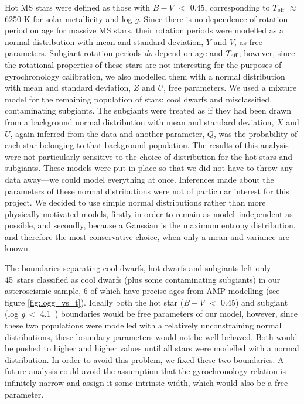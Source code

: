 \documentclass[11pt,preprint]{aastex}
\newcommand{\logg}{log \emph{g}}
\newcommand{\teff}{$T_{\rm{eff}}$}
\newcommand{\ncooldwarfs}{45~}
\newcommand{\subcut}{4.1~}
\begin{document}
Hot MS stars were defined as those with $B-V$ $<$ 0.45, corresponding to \teff$~\approx$ 6250 K for solar metallicity and \logg.
Since there is no dependence of rotation period on age for massive MS stars, their rotation periods were modelled as a normal distribution with mean and standard deviation, $Y$ and $V$, as free parameters.
Subgiant rotation periods \emph{do} depend on age and $T_{\rm{eff}}$; however, since the rotational properties of these stars are not interesting for the purposes of gyrochronology calibration, we also modelled them with a normal distribution with mean and standard deviation, $Z$ and $U$, free parameters.
We used a mixture model for the remaining population of stars: cool dwarfs and misclassified, contaminating subgiants.
The subgiants were treated as if they had been drawn from a background normal distribution with mean and standard deviation, $X$ and $U$, again inferred from the data and another parameter, $Q$, was the probability of each star belonging to that background population.
The results of this analysis were not particularly sensitive to the choice of distribution for the hot stars and subgiants.
These models were put in place so that we did not have to throw any data away---we could model everything at once.
Inferences made about the parameters of these normal distributions were not of particular interest for this project.
We decided to use simple normal distributions rather than more physically motivated models, firstly in order to remain as model--independent as possible, and secondly, because a Gaussian is the maximum entropy distribution, and therefore the most conservative choice, when only a mean and variance are known.

The boundaries separating cool dwarfs, hot dwarfs and subgiants left only \ncooldwarfs stars classified as cool dwarfs (plus some contaminating subgiants) in our asteroseismic sample, 6 of which have precise ages from AMP modelling (see figure \ref{fig:logg_vs_t}).
Ideally both the hot star ($B-V$ $<$ 0.45) and subgiant (\logg$~<$ \subcut) boundaries would be free parameters of our model, however, since these two populations were modelled with a relatively unconstraining normal distributions, these boundary parameters would not be well behaved.
Both would be pushed to higher and higher values until all stars were modelled with a normal distribution.
In order to avoid this problem, we fixed these two boundaries.
A future analysis could avoid the assumption that the gyrochronology relation is infinitely narrow and assign it some intrinsic width, which would also be a free parameter.
\end{document}
